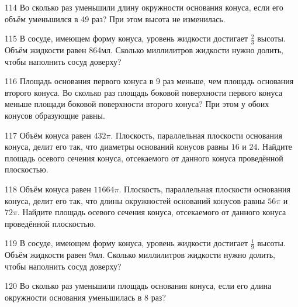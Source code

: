 \documentclass[a4paper]{article}
\begin{document}
\begin{taskBN}{114}
Во сколько раз уменьшили длину окружности основания конуса, если его объём уменьшился в 49 раз? При этом высота не изменилась.
\end{taskBN}

\begin{taskBN}{115}
В сосуде, имеющем форму конуса, уровень жидкости достигает $\frac{2}{3}$ высоты. Объём жидкости равен 864мл. Сколько миллилитров жидкости нужно долить, чтобы наполнить сосуд доверху?
\end{taskBN}

\begin{taskBN}{116}
Площадь основания первого конуса в 9 раз меньше, чем площадь основания второго конуса. Во сколько раз площадь боковой поверхности первого конуса меньше площади боковой поверхности второго конуса? При этом у обоих конусов образующие равны.
\end{taskBN}

\begin{taskBN}{117}
Объём конуса равен $432\pi$. Плоскость, параллельная плоскости основания конуса,  делит его так, что диаметры оснований конусов равны $16$ и $24$. Найдите площадь осевого сечения конуса, отсекаемого от данного конуса проведённой плоскостью. 
\end{taskBN}

\begin{taskBN}{118}
Объём конуса равен $11664\pi$. Плоскость, параллельная плоскости основания конуса,  делит его так, что длины окружностей оснований конусов равны $56\pi$ и $72\pi$. Найдите площадь осевого сечения конуса, отсекаемого от данного конуса проведённой плоскостью. 
\end{taskBN}

\begin{taskBN}{119}
В сосуде, имеющем форму конуса, уровень жидкости достигает $\frac{1}{9}$ высоты. Объём жидкости равен 9мл. Сколько миллилитров жидкости нужно долить, чтобы наполнить сосуд доверху?
\end{taskBN}

\begin{taskBN}{120}
Во сколько раз уменьшили площадь основания конуса, если его длина окружности основания уменьшилась в 8 раз?
\end{taskBN}
\end{document}
